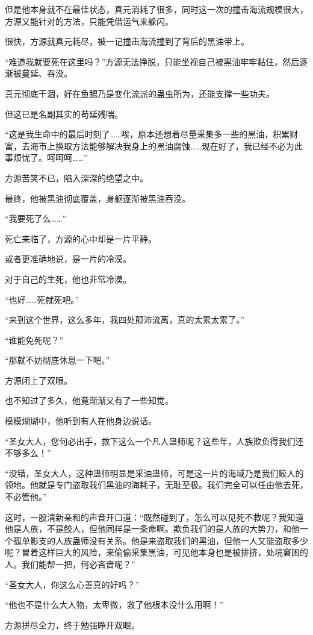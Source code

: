 \begin{this_body}
但是他本身就不在最佳状态，真元消耗了很多，同时这一次的撞击海流规模很大，方源又能针对的方法，只能凭借运气来躲闪。

很快，方源就真元耗尽，被一记撞击海流撞到了背后的黑油带上。

“难道我就要死在这里吗？”方源无法挣脱，只能坐视自己被黑油牢牢黏住，然后逐渐被蔓延、吞没。

真元彻底干涸，好在鱼鳃乃是变化流派的蛊虫所为，还能支撑一些功夫。

但这已是名副其实的苟延残喘。

“这是我生命中的最后时刻了……唉，原本还想着尽量采集多一些的黑油，积累财富，去海市上换取方法能够解决我身上的黑油腐蚀……现在好了，我已经不必为此事烦忧了。呵呵呵……”

方源苦笑不已，陷入深深的绝望之中。

最终，他被黑油彻底覆盖，身躯逐渐被黑油吞没。

“我要死了么……”

死亡来临了，方源的心中却是一片平静。

或者更准确地说，是一片的冷漠。

对于自己的生死，他也非常冷漠。

“也好……死就死吧。”

“来到这个世界，这么多年，我四处颠沛流离，真的太累太累了。”

“谁能免死呢？”

“那就不妨彻底休息一下吧。”

方源闭上了双眼。

也不知过了多久，他竟渐渐又有了一些知觉。

模模煳煳中，他听到有人在他身边说话。

“圣女大人，您何必出手，救下这么一个凡人蛊师呢？这些年，人族欺负得我们还不够多么！”

“没错，圣女大人，这种蛊师明显是采油蛊师，可是这一片的海域乃是我们鲛人的领地。他就是专门盗取我们黑油的海耗子，无耻至极。我们完全可以任由他去死，不必管他。”

这时，一股清新亲和的声音开口道：“既然碰到了，怎么可以见死不救呢？我知道他是人族，不是鲛人，但他同样是一条命啊。欺负我们的是人族的大势力，和他一个孤单影支的人族蛊师没有关系。他是来盗取我们的黑油，但他一人又能盗取多少呢？冒着这样巨大的风险，来偷偷采集黑油，可见他本身也是被排挤，处境窘困的人。我们能帮一把，何必吝啬呢？”

“圣女大人，你这么心善真的好吗？”

“他也不是什么大人物，太卑微，救了他根本没什么用啊！”

方源拼尽全力，终于勉强睁开双眼。


\end{this_body}
